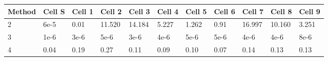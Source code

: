 \begin{tabular}{l l l l l l l l l l l }
\hline
Method & Cell S & Cell 1 & Cell 2 & Cell 3 & Cell 4 & Cell 5 & Cell 6 & Cell 7 & Cell 8 & Cell 9\\
\hline
2      & 6e-5   & 0.01   & 11.520 & 14.184 & 5.227  & 1.262  & 0.91   & 16.997 & 10.160 & 3.251 \\
3      & 1e-6   & 3e-6   & 5e-6   & 3e-6   & 4e-6   & 5e-6   & 5e-6   & 4e-6   & 4e-6   & 8e-6  \\
4      & 0.04   & 0.19   & 0.27   & 0.11   & 0.09   & 0.10   & 0.07   & 0.14   & 0.13   & 0.13  \\
\hline
\end{tabular}
